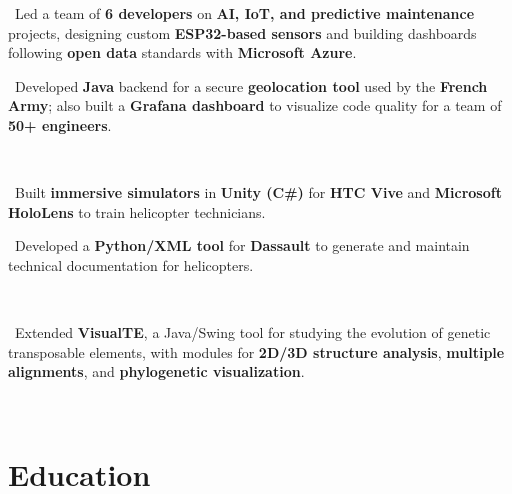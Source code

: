 \documentclass{muratcan_cv}
\newcommand{\tightbullet}[1]{\coloredbullet\ #1\par}
\renewcommand{\explanationdetail}[1]{%
    \indent \indent \begin{minipage}{0.87\linewidth} \fontsize{8.35pt}{9.7pt}\selectfont #1 \end{minipage} \\[0.03cm]
}
\begin{document}
\explanationdetail{
    \tightbullet{Led a team of \textbf{6 developers} on \textbf{AI, IoT, and predictive maintenance} projects, designing custom \textbf{ESP32-based sensors} and building dashboards following \textbf{open data} standards with \textbf{Microsoft Azure}.}
    \tightbullet{Developed \textbf{Java} backend for a secure \textbf{geolocation tool} used by the \textbf{French Army}; also built a \textbf{Grafana dashboard} to visualize code quality for a team of \textbf{50+ engineers}.}
}

\explanationdetail{
    \tightbullet{Built \textbf{immersive simulators} in \textbf{Unity (C\#)} for \textbf{HTC Vive} and \textbf{Microsoft HoloLens} to train helicopter technicians.}
    \tightbullet{Developed a \textbf{Python/XML tool} for \textbf{Dassault} to generate and maintain technical documentation for helicopters.}
}
\explanationdetail{
    \tightbullet{Extended \textbf{VisualTE}, a Java/Swing tool for studying the evolution of genetic transposable elements, with modules for \textbf{2D/3D structure analysis}, \textbf{multiple alignments}, and \textbf{phylogenetic visualization}.}
}
\vspace{1.3ex}

\section{Education}
\vspace{-0.5ex}
\end{document}
